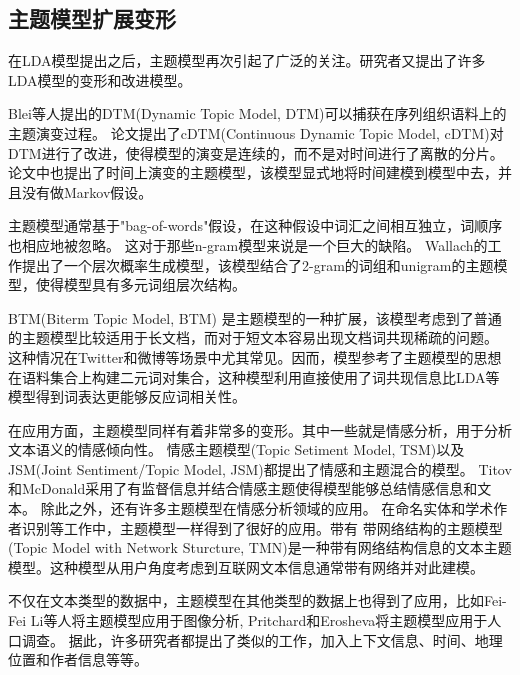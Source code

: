 \subsection{主题模型扩展变形}
在LDA模型提出之后，主题模型再次引起了广泛的关注。研究者又提出了许多LDA模型的变形和改进模型。

Blei等人提出的DTM(Dynamic Topic Model, DTM)\cite{blei2006dynamic}可以捕获在序列组织语料上的主题演变过程。
论文\cite{wang2012continuous}提出了cDTM(Continuous Dynamic Topic Model, cDTM)对DTM进行了改进，使得模型的演变是连续的，而不是对时间进行了离散的分片。
论文\cite{wang2006topics}中也提出了时间上演变的主题模型，该模型显式地将时间建模到模型中去，并且没有做Markov假设。

主题模型通常基于"bag-of-words"假设，在这种假设中词汇之间相互独立，词顺序也相应地被忽略。
这对于那些n-gram模型来说是一个巨大的缺陷。
Wallach的工作\cite{wallach2006topic}提出了一个层次概率生成模型，该模型结合了2-gram的词组和unigram的主题模型，使得模型具有多元词组层次结构。

BTM(Biterm Topic Model, BTM) \cite{yan2013biterm}是主题模型的一种扩展，该模型考虑到了普通的主题模型比较适用于长文档，而对于短文本容易出现文档词共现稀疏的问题。
这种情况在Twitter和微博等场景中尤其常见。因而，模型参考了主题模型的思想在语料集合上构建二元词对集合，这种模型利用直接使用了词共现信息比LDA等模型得到词表达更能够反应词相关性。

在应用方面，主题模型同样有着非常多的变形。其中一些就是情感分析，用于分析文本语义的情感倾向性。
情感主题模型(Topic Setiment Model, TSM)\cite{mei2007topic}以及JSM(Joint Sentiment/Topic Model, JSM)\cite{lin2009joint}都提出了情感和主题混合的模型。
Titov和McDonald\cite{titov2008modeling, titov2008joint}采用了有监督信息并结合情感主题使得模型能够总结情感信息和文本。
除此之外，还有许多主题模型在情感分析领域的应用\cite{lu2011multi, jo2011aspect, li2010sentiment, si2013exploiting}。
在命名实体\cite{han2012entity, newman2006statistical, shu2009latent, kim2012etm}和学术作者识别\cite{rosen2004author}等工作中，主题模型一样得到了很好的应用。带有
带网络结构的主题模型(Topic Model with Network Sturcture, TMN)\cite{mei2008topic}是一种带有网络结构信息的文本主题模型。这种模型从用户角度考虑到互联网文本信息通常带有网络并对此建模。

不仅在文本类型的数据中，主题模型在其他类型的数据上也得到了应用，比如Fei-Fei Li等人将主题模型应用于图像分析\cite{fei2005bayesian, sivic2005discovering}, 
Pritchard\cite{pritchard2000inference}和Erosheva\cite{erosheva2002grade}将主题模型应用于人口调查。
据此，许多研究者都提出了类似的工作，加入上下文信息\cite{mei2006mixture}、时间\cite{wang2006topics}、地理位置和作者信息等等。

